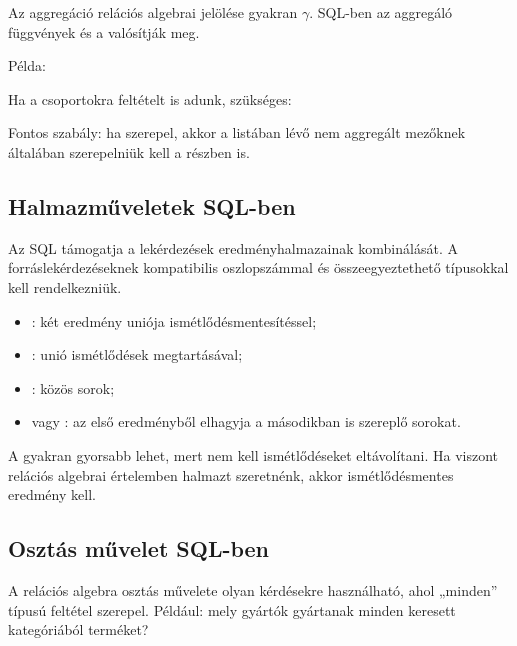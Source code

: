 Az aggregáció relációs algebrai jelölése gyakran \(\gamma\). SQL-ben az aggregáló függvények és a  valósítják meg.

Példa:

\begin{center}
\end{center}

Ha a csoportokra feltételt is adunk,  szükséges:

\begin{center}
\end{center}

Fontos szabály: ha  szerepel, akkor a  listában lévő nem aggregált mezőknek általában szerepelniük kell a  részben is.

\subsection{Halmazműveletek SQL-ben}

Az SQL támogatja a lekérdezések eredményhalmazainak kombinálását. A forráslekérdezéseknek kompatibilis oszlopszámmal és összeegyeztethető típusokkal kell rendelkezniük.

\begin{itemize}
  \item {}: két eredmény uniója ismétlődésmentesítéssel;
  \item {}: unió ismétlődések megtartásával;
  \item {}: közös sorok;
  \item {} vagy : az első eredményből elhagyja a másodikban is szereplő sorokat.
\end{itemize}

A  gyakran gyorsabb lehet, mert nem kell ismétlődéseket eltávolítani. Ha viszont relációs algebrai értelemben halmazt szeretnénk, akkor ismétlődésmentes eredmény kell.

\subsection{Osztás művelet SQL-ben}

A relációs algebra osztás művelete olyan kérdésekre használható, ahol „minden” típusú feltétel szerepel. Például: mely gyártók gyártanak minden keresett kategóriából terméket?

